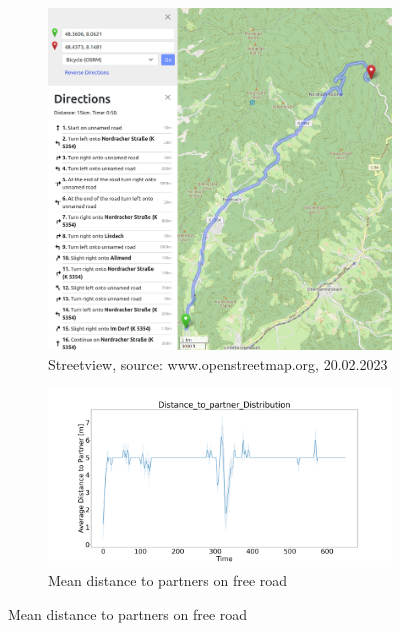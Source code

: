 \begin{figure}[H]
    \centering
    \begin{subfigure}[b]{0.45\textwidth}
        \centering
        \includegraphics[width=1.0\linewidth]{images/Nordracher/Nordracher.png}
        \caption{Streetview, source: www.openstreetmap.org, 20.02.2023}
    \end{subfigure}
    \hfill
    \begin{subfigure}[b]{0.45\textwidth}
        \centering
        \includegraphics[width=1.0\linewidth]{images/Nordracher/Nordracher_K6769_AVG_Distance_to_partner_distribution_free.png}
        \caption{Mean distance to partners on free road}
    \end{subfigure}

\end{figure}
